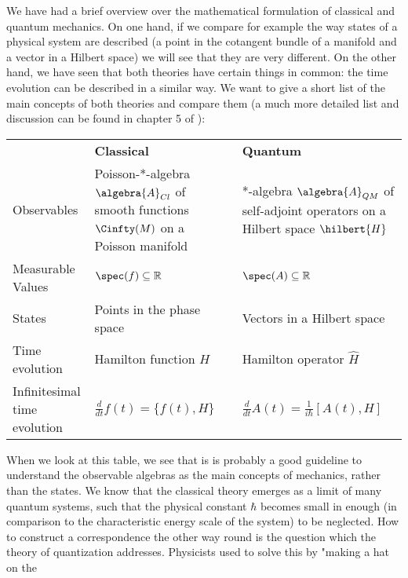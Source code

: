 We have had a brief overview over the mathematical formulation of classical and 
quantum mechanics. On one hand, if we compare for example the way states of a 
physical system are described (a point in the cotangent bundle of a manifold and a 
vector in a Hilbert space) we will see that they are very different. On the other 
hand, we have seen that both theories have certain things in common: the time 
evolution can be described in a similar way. We want to give a short list of the 
main concepts of both theories and compare them (a much more detailed list and 
discussion can be found in chapter 5 of \cite{waldmann:2007a}):
\bgroup
\renewcommand{\arraystretch}{1.6}
\begin{center}
	\begin{tabular}
	{lll}
		~ 
		&
		\textbf{Classical} 
		&
		\textbf{Quantum}
		\\
		\parbox{4cm}
		{
			Observables
		}
		&
		\parbox{5cm}{
			Poisson-*-algebra $\algebra{A}_{Cl}$
			of \\
			smooth functions $\Cinfty(M)$ \\
			on a Poisson manifold
		}
		&
		\parbox{5cm}{
			*-algebra $\algebra{A}_{QM}$
			of self-adjoint operators
			on a Hilbert space $\hilbert{H}$
		}
		\\
		\parbox{4cm}
		{
			Measurable 
			Values
		}
		&
		$\spec (f) \subseteq \mathbb{R}$
		&
		$\spec (A) \subseteq \mathbb{R}$
		\\
		States
		&
		\parbox{5cm}{
			Points in the
			phase space
		}
		&
		\parbox{5cm}{
			Vectors in a
			Hilbert space
		}
		\\
		Time evolution
		&
		Hamilton function $H$
		&
		Hamilton operator $\hat{H}$
		\\
		\parbox{4cm}{
			Infinitesimal\\
			time evolution
		}
		&
		$
		\frac{d}{dt} f(t)
		=
		\{f(t), H\}
		$
		&
		$\frac{d}{dt} A(t)
		=
		\frac{1}{i \hbar}
		[A(t), H]
		$
	\end{tabular} 
\end{center}
\egroup
When we look at this table, we see that is is probably a good guideline to 
understand the observable algebras as the main concepts of mechanics, rather than 
the states. We know that the classical theory emerges as a limit of many quantum 
systems, such that the physical constant $\hbar$ becomes small in enough (in 
comparison to the characteristic energy scale of the system) to be neglected. How 
to construct a correspondence the other way round is the question which the theory 
of quantization addresses. Physicists used to solve this by "making a hat on the 
